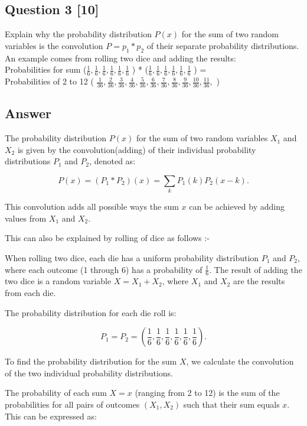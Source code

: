 \documentclass[12pt]{article}
\begin{document}
\subsection*{Question 3 [10]}
Explain why the probability distribution \( P(x) \) for the sum of two random variables is the convolution \( P = p_1 * p_2 \) of their separate probability distributions. An example comes from rolling two dice and adding the results:\\
Probabilities for sum (\(  \frac{1}{6},\frac{1}{6},\frac{1}{6},\frac{1}{6},\frac{1}{6},\frac{1}{6} \) ) * (\( \frac{1}{6},\frac{1}{6},\frac{1}{6},\frac{1}{6},\frac{1}{6},\frac{1}{6} \) ) = \\Probabilities of 2 to 12 ( \( \frac{1}{36},\frac{2}{36},\frac{3}{36},\frac{4}{36},\frac{5}{36},\frac{6}{36},\frac{7}{36},\frac{8}{36},\frac{9}{36},\frac{10}{36},\frac{11}{36}, \) )
\subsection*{Answer}


The probability distribution \( P(x) \) for the sum of two random variables \( X_1 \) and \( X_2 \) is given by the convolution(adding) of their individual probability distributions \( P_1 \) and \( P_2 \), denoted as:

\[
P(x) = (P_1 * P_2)(x) = \sum_{k} P_1(k) P_2(x - k).
\]

This convolution adds all possible ways the sum \( x \) can be achieved by adding values from \( X_1 \) and \( X_2 \).

This can also be explained by rolling of dice as follows :-

When rolling two dice, each die has a uniform probability distribution \( P_1 \) and \( P_2 \), where each outcome (1 through 6) has a probability of \( \frac{1}{6} \). The result of adding the two dice is a random variable \( X = X_1 + X_2 \), where \( X_1 \) and \( X_2 \) are the results from each die.

The probability distribution for each die roll is:

\[
P_1 = P_2 = \left( \frac{1}{6}, \frac{1}{6}, \frac{1}{6}, \frac{1}{6}, \frac{1}{6}, \frac{1}{6} \right).
\]

To find the probability distribution for the sum \( X \), we calculate the convolution of the two individual probability distributions.

The probability of each sum \( X = x \) (ranging from 2 to 12) is the sum of the probabilities for all pairs of outcomes \( (X_1, X_2) \) such that their sum equals \( x \). This can be expressed as:
\end{document}
